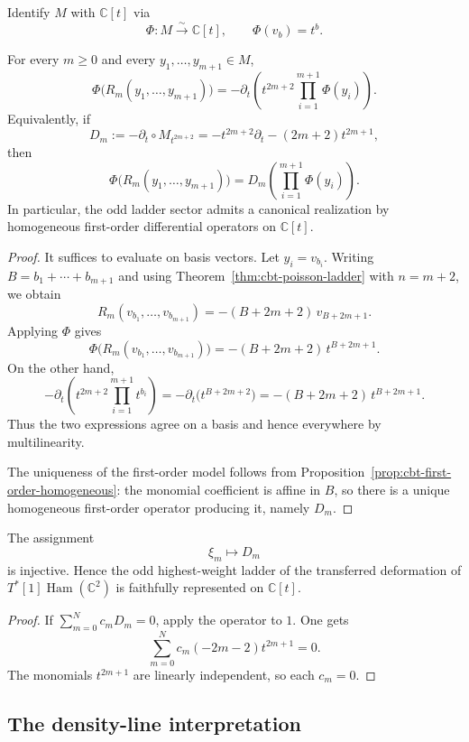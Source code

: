 Identify $M$ with $\mathbb{C}[t]$ via
\[
\Phi:M\xrightarrow{\;\sim\;}\mathbb{C}[t],
\qquad
\Phi(v_b)=t^b.
\]

\begin{theorem}
For every $m\ge0$ and every $y_1,\dots,y_{m+1}\in M$,
\[
\Phi\bigl(R_m(y_1,\dots,y_{m+1})\bigr)
=
-\partial_t\!\left(
t^{2m+2}\prod_{i=1}^{m+1}\Phi(y_i)
\right).
\]
Equivalently, if
\[
D_m:=-\partial_t\circ M_{t^{2m+2}}
=
-t^{2m+2}\partial_t-(2m+2)t^{2m+1},
\]
then
\[
\Phi\bigl(R_m(y_1,\dots,y_{m+1})\bigr)
=
D_m\!\left(\prod_{i=1}^{m+1}\Phi(y_i)\right).
\]
In particular, the odd ladder sector admits a canonical realization by homogeneous first-order differential operators on $\mathbb{C}[t]$.
\end{theorem}

\begin{proof}
It suffices to evaluate on basis vectors. Let $y_i=v_{b_i}$. Writing $B=b_1+\cdots+b_{m+1}$ and using Theorem~\ref{thm:cbt-poisson-ladder} with $n=m+2$, we obtain
\[
R_m(v_{b_1},\dots,v_{b_{m+1}})
=
-(B+2m+2)\,v_{B+2m+1}.
\]
Applying $\Phi$ gives
\[
\Phi\bigl(R_m(v_{b_1},\dots,v_{b_{m+1}})\bigr)
=
-(B+2m+2)\,t^{B+2m+1}.
\]
On the other hand,
\[
-\partial_t\!\left(
t^{2m+2}\prod_{i=1}^{m+1}t^{b_i}
\right)
=
-\partial_t\bigl(t^{B+2m+2}\bigr)
=
-(B+2m+2)\,t^{B+2m+1}.
\]
Thus the two expressions agree on a basis and hence everywhere by multilinearity.

The uniqueness of the first-order model follows from Proposition~\ref{prop:cbt-first-order-homogeneous}: the monomial coefficient is affine in $B$, so there is a unique homogeneous first-order operator producing it, namely $D_m$.
\end{proof}

\begin{corollary}[faithfulness]
The assignment
\[
\xi_m\longmapsto D_m
\]
is injective. Hence the odd highest-weight ladder of the transferred deformation of $T^*[1]\operatorname{Ham}(\mathbb{C}^2)$ is faithfully represented on $\mathbb{C}[t]$.
\end{corollary}

\begin{proof}
If $\sum_{m=0}^N c_mD_m=0$, apply the operator to $1$. One gets
\[
\sum_{m=0}^N c_m(-2m-2)t^{2m+1}=0.
\]
The monomials $t^{2m+1}$ are linearly independent, so each $c_m=0$.
\end{proof}

\subsection{The density-line interpretation}


